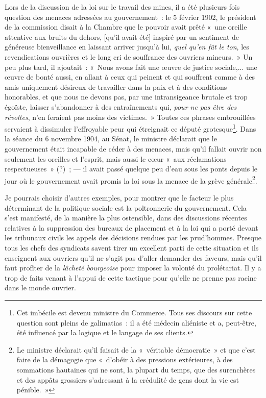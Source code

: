 \documentclass[french,twoside]{book} %
\begin{document}
Lors de la discussion de la loi sur le travail des mines, il a été plusieurs fois question des menaces adressées au gouvernement : le 5 février 1902, le président de la commission disait à la Chambre que le pouvoir avait prêté « une oreille attentive aux bruits du dehors, [qu’il avait été] inspiré par un sentiment de généreuse bienveillance en laissant arriver jusqu’à lui, \emph{quel qu’en fût le ton}, les revendications ouvrières et le long cri de souffrance des ouvriers mineurs. » Un peu plus tard, il ajoutait : « Nous avons fait une œuvre de justice sociale,... une œuvre de bonté aussi, en allant à ceux qui peinent et qui souffrent comme à des amis uniquement désireux de travailler dans  la paix et à des conditions honorables, et que nous ne devons pas, par une intransigeance brutale et trop égoïste, laisser s’abandonner à des entraînements qui, \emph{pour ne pas être des révoltes}, n’en feraient pas moins des victimes. » Toutes ces phrases embrouillées servaient à dissimuler l’effroyable peur qui étreignait ce député grotesque\footnote{ \noindent Cet imbécile est devenu ministre du Commerce. Tous ses discours sur cette question sont pleins de galimatias : il a été médecin aliéniste et a, peut-être, été influencé par la logique et le langage de ses clients.
 }. Dans la séance du 6 novembre 1904, au Sénat, le ministre déclarait que le gouvernement était incapable de céder à des menaces, mais qu’il fallait ouvrir non seulement les oreilles et l’esprit, mais aussi le cœur « aux réclamations respectueuses » (?) ; — il avait passé quelque peu d’eau sous les ponts depuis le jour où le gouvernement avait promis la loi sous la menace de la grève générale\footnote{ \noindent Le ministre déclarait qu’il faisait de la « véritable démocratie » et que c’est faire de la démagogie que « d’obéir à des pressions extérieures, à des sommations hautaines qui ne sont, la plupart du temps, que des surenchères et des appâts grossiers s’adressant à la crédulité de gens dont la vie est pénible. »
 }.\par
Je pourrais choisir d’autres exemples, pour montrer que le facteur le plus déterminant de la politique sociale est la poltronnerie du gouvernement. Cela s’est manifesté, de la manière la plus ostensible, dans des discussions récentes relatives à la suppression des bureaux de placement et à la loi qui a porté devant les tribunaux civils les appels des décisions rendues par les prud’hommes. Presque tous les chefs des syndicats savent tirer un excellent parti de cette  situation et ils enseignent aux ouvriers qu’il ne s’agit pas d’aller demander des faveurs, mais qu’il faut profîter de la \emph{lâcheté bourgeoise} pour imposer la volonté du prolétariat. Il y a trop de faits venant à l’appui de cette tactique pour qu’elle ne prenne pas racine dans le monde ouvrier.\par
\end{document}
